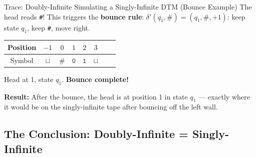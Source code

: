 \begin{examplebox}{{Trace: Doubly-Infinite Simulating a Singly-Infinite DTM (Bounce Example)}}
The head reads \texttt{\#}! This triggers the \textbf{bounce rule}:
$\delta'(q_1, \#) = (q_1, \#, +1)$: keep state $q_1$, keep \texttt{\#},
move right.

\begin{center}
\begin{tabular}{c|ccccccc}
Position & $-1$ & $0$ & $1$ & $2$ & $3$ \\
\hline
Symbol & $\sqcup$ & $\#$ & $\mathtt{0}$ & $\mathtt{1}$ & $\sqcup$ \\
\end{tabular}
\quad Head at 1, state $q_1$. \textbf{Bounce complete!}
\end{center}

\textbf{Result:} After the bounce, the head is at position 1 in state $q_1$
--- exactly where it would be on the singly-infinite tape after bouncing off
the left wall.

\end{examplebox}


\subsection{The Conclusion: Doubly-Infinite = Singly-Infinite}
\label{subsec:doubly-infinite-conclusion}


